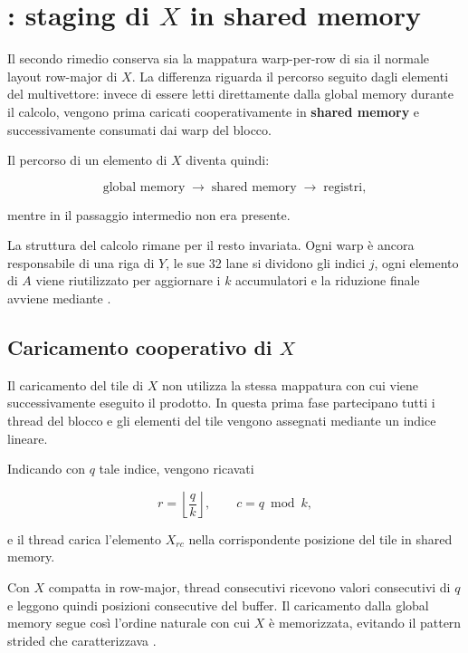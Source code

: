 \section{: staging di $X$ in shared memory}
\label{sec:smem}

Il secondo rimedio conserva sia la mappatura warp-per-row di
 sia il normale layout row-major di $X$.
La differenza riguarda il percorso seguito dagli elementi del multivettore:
invece di essere letti direttamente dalla global memory durante il calcolo,
vengono prima caricati cooperativamente in \textbf{shared memory} e successivamente
consumati dai warp del blocco.

Il percorso di un elemento di $X$ diventa quindi:

\[
\text{global memory}
\;\longrightarrow\;
\text{shared memory}
\;\longrightarrow\;
\text{registri},
\]

mentre in  il passaggio intermedio non era presente.

La struttura del calcolo rimane per il resto invariata. Ogni warp è ancora
responsabile di una riga di $Y$, le sue 32 lane si dividono gli indici $j$,
ogni elemento di $A$ viene riutilizzato per aggiornare i $k$ accumulatori
e la riduzione finale avviene mediante .

\subsection{Caricamento cooperativo di $X$}

Il caricamento del tile di $X$ non utilizza la stessa mappatura con cui
viene successivamente eseguito il prodotto. In questa prima fase
partecipano tutti i thread del blocco e gli elementi del tile vengono
assegnati mediante un indice lineare.

Indicando con $q$ tale indice, vengono ricavati

\[
r = \left\lfloor \frac{q}{k} \right\rfloor,
\qquad
c = q \bmod k,
\]

e il thread carica l'elemento $X_{rc}$ nella corrispondente posizione del
tile in shared memory.

Con $X$ compatta in row-major, thread consecutivi ricevono valori
consecutivi di $q$ e leggono quindi posizioni consecutive del buffer.
Il caricamento dalla global memory segue così l'ordine naturale con cui
$X$ è memorizzata, evitando il pattern strided che caratterizzava
.


